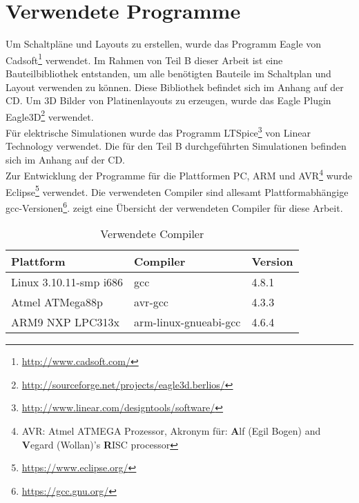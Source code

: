 \section{Verwendete Programme}
Um Schaltpläne und Layouts zu erstellen, wurde das Programm Eagle von Cadsoft\footnote{\url{http://www.cadsoft.com/}} verwendet. Im Rahmen von Teil B dieser Arbeit ist eine Bauteilbibliothek entstanden, um alle benötigten Bauteile im Schaltplan und Layout verwenden zu können. Diese Bibliothek befindet sich im Anhang auf der CD.
Um 3D Bilder von Platinenlayouts zu erzeugen, wurde das Eagle Plugin Eagle3D\footnote{\url{http://sourceforge.net/projects/eagle3d.berlios/}} verwendet.\\
Für elektrische Simulationen wurde das Programm LTSpice\footnote{\url{http://www.linear.com/designtools/software/}} von Linear Technology verwendet. Die für den Teil B durchgeführten Simulationen befinden sich im Anhang auf der CD.\\
Zur Entwicklung der Programme für die Plattformen PC, ARM und AVR\footnote{AVR: Atmel ATMEGA Prozessor, Akronym für: \textbf{A}lf (Egil Bogen) and \textbf{V}egard (Wollan)'s \textbf{R}ISC processor} wurde Eclipse\footnote{\url{https://www.eclipse.org/}} verwendet. Die verwendeten Compiler sind allesamt Plattformabhängige gcc-Versionen\footnote{\url{https://gcc.gnu.org/}}.  zeigt eine Übersicht der verwendeten Compiler für diese Arbeit.

\begin{table}[h]
\begin{tabular}{|p{4.5cm}|p{4cm}|p{4cm}|}\hline
\rowcolor{TableBackgroundColor} 
\textbf{Plattform}		&	\textbf{Compiler}		&	\textbf{Version}  \\ \hline
 Linux 3.10.11-smp i686	&	gcc						& 4.8.1	\\ \hline
 Atmel ATMega88p		&	avr-gcc					& 4.3.3	\\ \hline
 ARM9 NXP LPC313x		&	arm-linux-gnueabi-gcc	& 4.6.4	\\ \hline
\end{tabular}
\caption{Verwendete Compiler}
\label{tab:verwendete_compiler}
\end{table}